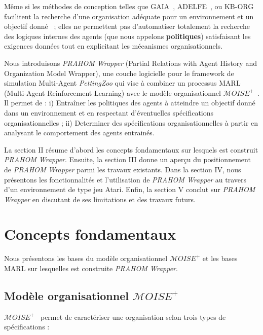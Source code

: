 \documentclass[demonstration]{jfsma}
\begin{document}
Même si les méthodes de conception telles que GAIA~\cite{Wooldridge2000,Cernuzzi2014}, ADELFE~\cite{Mefteh2015},
ou KB-ORG~\cite{Sims2008} facilitent la recherche d'une organisation adéquate pour un environnement et un objectif donné~\cite{Mefteh2013} ; elles ne permettent pas d'automatiser totalement la recherche des logiques internes des agents (que nous appelons \textbf{politiques}) satisfaisant les exigences données tout en explicitant les mécanismes organisationnels.

Nous introduisons \emph{PRAHOM Wrapper} (Partial Relations with Agent History and Organization Model Wrapper), une couche logicielle pour le framework de simulation Multi-Agent \emph{PettingZoo} qui vise à combiner un processus MARL (Multi-Agent Reinforcement Learning) avec le modèle organisationnel $\mathcal{M}OISE^+$~\cite{Hubner2007}. Il permet de :
%
i) Entraîner les politiques des agents à atteindre un objectif donné dans un environnement et en respectant d'éventuelles spécifications organisationnelles ;\quad
ii) Determiner des spécifications organisationnelles à partir en analysant le comportement des agents entrainés.

La section II résume d'abord les concepts fondamentaux sur lesquels est construit \emph{PRAHOM Wrapper}.
Ensuite, la section III donne un aperçu du positionnement de \emph{PRAHOM Wrapper} parmi les travaux existants.
Dans la section IV, nous présentons les fonctionnalités et l'utilisation de \emph{PRAHOM Wrapper} au travers d'un environnement de type jeu Atari. Enfin, la section V conclut sur \emph{PRAHOM Wrapper} en discutant de ses limitations et des travaux futurs.


\section{Concepts fondamentaux}

Nous présentons les bases du modèle organisationnel $\mathcal{M}OISE^+$ et les bases MARL sur lesquelles est construite \emph{PRAHOM Wrapper}.

\subsection{Modèle organisationnel $\mathcal{M}OISE^+$}

$\mathcal{M}OISE^+$~\cite{Hubner2007} permet de caractériser une organisation selon trois types de spécifications :
\end{document}
